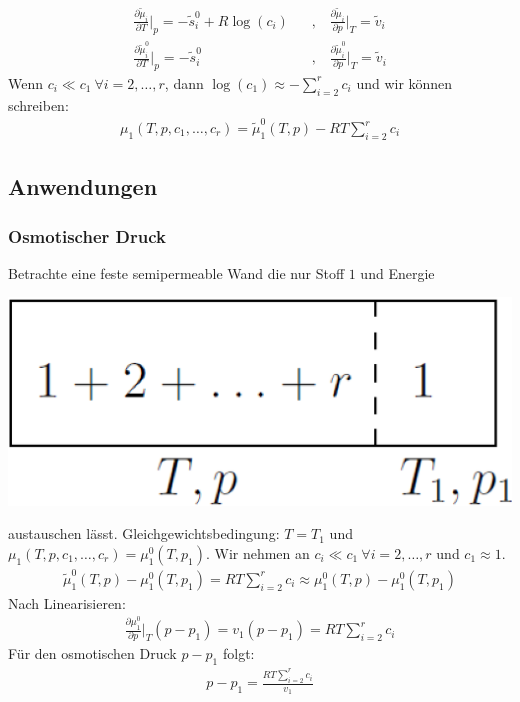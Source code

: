 \begin{align*}
    \frac{\partial \tilde{\mu}_i}{\partial T} \Big|_p = - \tilde{s}_i^0 + R \log(c_i)
    \hspace{10pt} &, \hspace{10pt}
    \frac{\partial \tilde{\mu}_i}{\partial p} \Big|_T = \tilde{v}_i
    \\
    \frac{\partial \tilde{\mu}_i^0}{\partial T} \Big|_p = - \tilde{s}_i^0
    \hspace{10pt} &, \hspace{10pt}
    \frac{\partial \tilde{\mu}_i^0}{\partial p} \Big|_T = \tilde{v}_i
\end{align*}
Wenn $c_i \ll c_1 \ \forall i = 2,\dots,r$, dann $\log(c_1) \approx - \sum_{i=2}^r c_i$
und wir können schreiben:
\begin{align*}
    \mu_1 (T,p,c_1,\dots,c_r) = \tilde{\mu}_1^0 (T,p) - R T \sum_{i=2}^r c_i
\end{align*}

\subsection{Anwendungen}

\begin{minipage}{0.3\textwidth}
    \subsubsection{Osmotischer Druck}

    Betrachte eine feste semipermeable Wand die nur Stoff $1$ und Energie
\end{minipage} \hspace{5pt}
\begin{minipage}{0.175\textwidth}
    \includegraphics[width=\textwidth]{Bilder/Osmotischer_Druck.png}
\end{minipage}
austauschen lässt.
Gleichgewichtsbedingung: $T = T_1$ und $\mu_1 (T,p,c_1,\dots,c_r) = \mu_1^0 (T,p_1)$.
Wir nehmen an $c_i \ll c_1 \ \forall i = 2,\dots,r$ und $c_1 \approx 1$.
\begin{align*}
    \tilde{\mu}_1^0 (T,p) - \mu_1^0 (T,p_1) = R T \sum_{i=2}^r c_i
    \approx
    \mu_1^0 (T,p) - \mu_1^0 (T,p_1)
\end{align*}
Nach Linearisieren:
\begin{align*}
    \frac{\partial \mu_1^0}{\partial p} \Big|_T (p-p_1)
    = v_1 (p-p_1)
    = R T \sum_{i=2}^r c_i
\end{align*}
Für den osmotischen Druck $p-p_1$ folgt:
\begin{align*}
    p - p_1 = \frac{R T \sum_{i=2}^r c_i}{v_1}
\end{align*}

